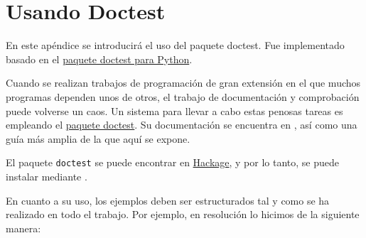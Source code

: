 \chapter{Usando Doctest}\label{aped.B}

En este apéndice se introducirá el uso del paquete doctest. Fue implementado
basado en el \href{https://docs.python.org/3/library/doctest.html}{paquete doctest para Python}.

Cuando se realizan trabajos de programación de gran extensión en el que muchos programas
dependen unos de otros, el trabajo de documentación y comprobación puede volverse un caos.
Un sistema para llevar a cabo estas penosas tareas es empleando el \href{https://hackage.haskell.org/package/doctest}{paquete doctest}. Su documentación se encuentra en \cite{DoctestDoc}, así como una guía más amplia de la que aquí se expone.


El paquete \texttt{doctest} se puede encontrar en \href{http://hackage.haskell.org/package/doctest}{Hackage}, y por lo tanto, se puede instalar mediante .

En cuanto a su uso, los ejemplos deben ser estructurados tal y como se ha realizado en todo el trabajo. Por ejemplo, en resolución lo hicimos de la siguiente manera:

